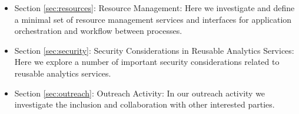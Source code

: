 \begin{itemize}
\item Section \ref{sec:resources}: Resource Management: Here we
  investigate and define a minimal set of resource management services
  and interfaces for application orchestration and workflow between
  processes.

\item Section \ref{sec:security}: Security Considerations in Reusable
  Analytics Services: Here we explore a number of important security
  considerations related to reusable analytics services.  

\item Section \ref{sec:outreach}: Outreach Activity: In our outreach
  activity we investigate the inclusion and collaboration with other
  interested parties.

\end{itemize}

